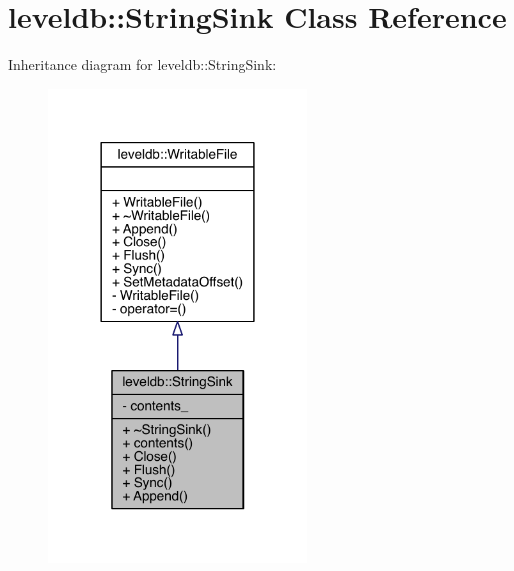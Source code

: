 \hypertarget{classleveldb_1_1_string_sink}{}\section{leveldb\+:\+:String\+Sink Class Reference}
\label{classleveldb_1_1_string_sink}


Inheritance diagram for leveldb\+:\+:String\+Sink\+:\nopagebreak
\begin{figure}[H]
\begin{center}
\leavevmode
\includegraphics[width=194pt]{classleveldb_1_1_string_sink__inherit__graph}
\end{center}
\end{figure}


